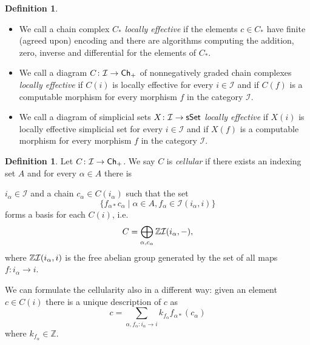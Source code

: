 \documentclass[12pt,a4wide]{article}
\theoremstyle{plain}
\theoremstyle{definition}
\newtheorem{Def}[thm]{Definition}
\renewcommand\:{\colon}
\newcommand{\dX}{X}
\newcommand{\dC}{{C}}
\newcommand{\icat}{\mathcal I}
\begin{document}
\begin{Def}\label{def:pointw-effective}
\begin{itemize}
\item We call a chain complex $C_*$ \emph{locally effective} if the elements $c\in C_*$ have finite (agreed upon) encoding and there are algorithms computing the addition, zero, inverse and differential for the elements of $C_*$. 

\item We call a diagram $\dC \colon\icat \to \Ch_+$ of nonnegatively graded chain complexes \emph{locally effective} if $\dC (i)$ is locally effective for every $i \in \icat$ and if $\dC(f)$ is a computable morphism for every morphism $f$ in the category $\icat$.

\item We call a diagram of simplicial sets $\dX \: \icat \to \sSet$ \emph{locally effective} if $\dX (i)$ is locally effective simplicial set for every $i \in \icat$ and if $\dX(f)$ is a computable morphism for every morphism $f$ in the category $\icat$.
\end{itemize}
\end{Def}

\begin{Def}
Let $\dC\colon \icat \to \Ch_{+}$. We say $\dC$ is \emph{cellular} if there exists an indexing set $A$ and for every $\alpha \in A$ there is \item $i_\alpha \in \icat$ and a chain $c_\alpha \in \dC(i_\alpha)$
such that the set
\[
\{f_{\alpha*} c_\alpha \mid \alpha \in A, f_{\alpha} \in  \icat(i_\alpha, i) \}
\]
forms a basis for each $C(i)$, i.e.
\begin{equation*}%
\dC = \bigoplus\limits_{\alpha, c_\alpha} \bbZ \icat(i_\alpha, -),
\end{equation*}
where $\bbZ \icat(i_\alpha, i)$ is the free abelian group generated by the set of all maps $f\: i_\alpha \to i$.
\end{Def}


We can formulate the cellularity also in a different way: given an element $c \in \dC (i)$ there is a unique description of $c$ as 
\begin{equation}\label{eq:cell}
c= \sum\limits_{\alpha, f_{\alpha}\: i_\alpha \to i} k_{f_{\alpha}} f_{\alpha*} (c_\alpha)
\end{equation}
where  $k_{f_\alpha} \in \mathbb{Z}$.
\end{document}
